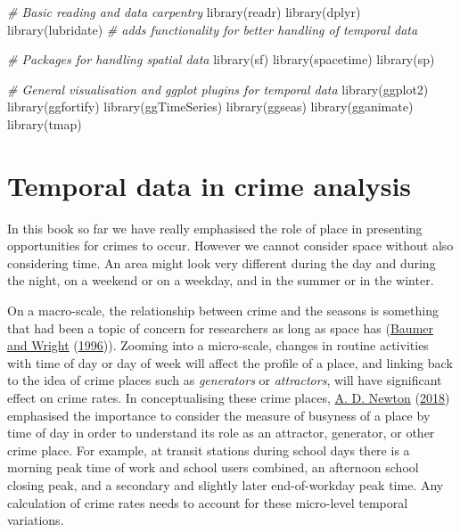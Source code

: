 \documentclass[
  krantz2]{krantz}
\makeatletter
\newenvironment{Shaded}{\begin{snugshade}}{\end{snugshade}}
\newcommand{\CommentTok}[1]{\textcolor[rgb]{0.37,0.37,0.37}{\textit{#1}}}
\newcommand{\FunctionTok}[1]{\textcolor[rgb]{0,0,0}{#1}}
\newcommand{\NormalTok}[1]{#1}
\newenvironment{kframe}{%
\medskip{}
\setlength{\fboxsep}{.8em}
 \def\at@end@of@kframe{}%
 \ifinner\ifhmode%
  \def\at@end@of@kframe{\end{minipage}}%
  \begin{minipage}{\columnwidth}%
 \fi\fi%
 \def\FrameCommand##1{\hskip\@totalleftmargin \hskip-\fboxsep
 \colorbox{shadecolor}{##1}\hskip-\fboxsep
     \hskip-\linewidth \hskip-\@totalleftmargin \hskip\columnwidth}%
 \MakeFramed {\advance\hsize-\width
   \@totalleftmargin\z@ \linewidth\hsize
   \@setminipage}}%
 {\par\unskip\endMakeFramed%
 \at@end@of@kframe}
\renewenvironment{Shaded}{\begin{kframe}}{\end{kframe}}
\makeatother
\begin{document}
\begin{Shaded}
\begin{Highlighting}[]
\CommentTok{\# Basic reading and data carpentry}
\FunctionTok{library}\NormalTok{(readr)}
\FunctionTok{library}\NormalTok{(dplyr)}
\FunctionTok{library}\NormalTok{(lubridate) }\CommentTok{\# adds functionality for better handling of temporal data}

\CommentTok{\# Packages for handling spatial data}
\FunctionTok{library}\NormalTok{(sf)}
\FunctionTok{library}\NormalTok{(spacetime)}
\FunctionTok{library}\NormalTok{(sp)}

\CommentTok{\# General visualisation and ggplot plugins for temporal data}
\FunctionTok{library}\NormalTok{(ggplot2)}
\FunctionTok{library}\NormalTok{(ggfortify)}
\FunctionTok{library}\NormalTok{(ggTimeSeries)}
\FunctionTok{library}\NormalTok{(ggseas)}
\FunctionTok{library}\NormalTok{(gganimate)}
\FunctionTok{library}\NormalTok{(tmap)}
\end{Highlighting}
\end{Shaded}

\hypertarget{temporal-data-in-crime-analysis}{%
\section{Temporal data in crime analysis}\label{temporal-data-in-crime-analysis}}

In this book so far we have really emphasised the role of place in presenting opportunities for crimes to occur. However we cannot consider space without also considering time. An area might look very different during the day and during the night, on a weekend or on a weekday, and in the summer or in the winter.

On a macro-scale, the relationship between crime and the seasons is something that had been a topic of concern for researchers as long as space has (\protect\hyperlink{ref-Baumer_1996}{Baumer and Wright} (\protect\hyperlink{ref-Baumer_1996}{1996})). Zooming into a micro-scale, changes in routine activities with time of day or day of week will affect the profile of a place, and linking back to the idea of crime places such as \emph{generators} or \emph{attractors}, will have significant effect on crime rates. In conceptualising these crime places, \protect\hyperlink{ref-Newton_2018}{A. D. Newton} (\protect\hyperlink{ref-Newton_2018}{2018}) emphasised the importance to consider the measure of busyness of a place by time of day in order to understand its role as an attractor, generator, or other crime place. For example, at transit stations during school days there is a morning peak time of work and school users combined, an afternoon school closing peak, and a secondary and slightly later end-of-workday peak time. Any calculation of crime rates needs to account for these micro-level temporal variations.
\end{document}
